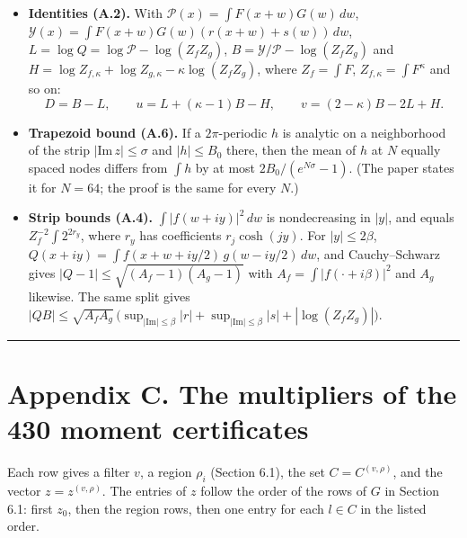 \documentclass[10pt,a4paper]{article}
\begin{document}
\begin{itemize}
\item \textbf{Identities (A.2).} With $\mathcal P(x) = \int F(x+w)G(w)\,dw$, $\mathcal Y(x) = \int F(x+w)G(w)(r(x+w) + s(w))\,dw$,
$L = \log Q = \log\mathcal P - \log(Z_fZ_g)$, $B = \mathcal Y/\mathcal P - \log(Z_fZ_g)$ and
$H = \log Z_{f,\kappa} + \log Z_{g,\kappa} - \kappa\log(Z_fZ_g)$, where $Z_f = \int F$, $Z_{f,\kappa} = \int F^\kappa$ and so on:
\[D = B - L,\qquad u = L + (\kappa - 1)B - H,\qquad v = (2 - \kappa)B - 2L + H.\]
\item \textbf{Trapezoid bound (A.6).} If a $2\pi$-periodic $h$ is analytic on a neighborhood of the strip $|\mathrm{Im}\,z| \le \sigma$
and $|h| \le B_0$ there, then the mean of $h$ at $N$ equally spaced nodes differs from $\int h$ by at most
$2B_0/(e^{N\sigma} - 1)$. (The paper states it for $N = 64$; the proof is the same for every $N$.)
\item \textbf{Strip bounds (A.4).} $\int|f(w + iy)|^2\,dw$ is nondecreasing in $|y|$, and equals $Z_f^{-2}\int2^{2r_y}$, where $r_y$
has coefficients $r_j\cosh(jy)$. For $|y| \le 2\beta$, $Q(x + iy) = \int f(x + w + iy/2)\,g(w - iy/2)\,dw$, and
Cauchy--Schwarz gives $|Q - 1| \le \sqrt{(A_f - 1)(A_g - 1)}$ with $A_f = \int|f(\cdot + i\beta)|^2$ and $A_g$ likewise.
The same split gives $|QB| \le \sqrt{A_fA_g}\,\big(\sup_{|\mathrm{Im}| \le \beta}|r| + \sup_{|\mathrm{Im}|\le\beta}|s| + |\log(Z_fZ_g)|\big)$.
\end{itemize}

\medskip\noindent\rule{\linewidth}{0.4pt}\medskip

\section*{Appendix C. The multipliers of the 430 moment certificates}

Each row gives a filter $v$, a region $\rho_i$ (Section 6.1), the set $C = C^{(v,\rho)}$, and the vector
$z = z^{(v,\rho)}$. The entries of $z$ follow the order of the rows of $G$ in Section 6.1: first $z_0$, then the region
rows, then one entry for each $l \in C$ in the listed order.
\end{document}
